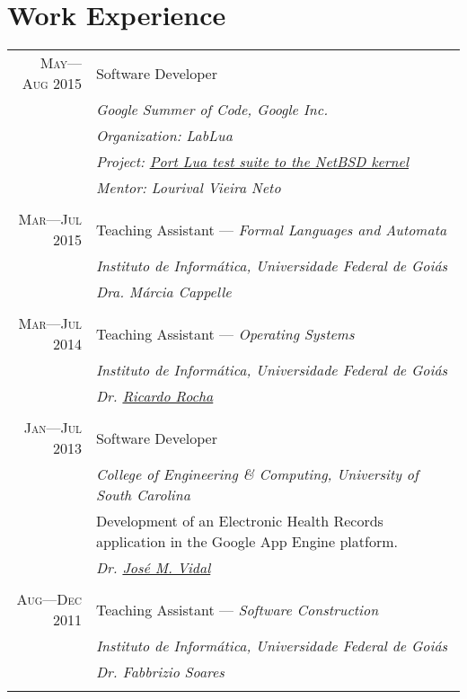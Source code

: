 \documentclass[a4paper,10pt]{article}
\begin{document}
\section{Work Experience}
\begin{tabular}{r|p{11cm}}

  \textsc{May---Aug 2015}
  & Software Developer\\
  &\emph{Google Summer of Code, Google Inc.}\\
  &\emph{Organization: LabLua}\\
  &\emph{Project: \footnotesize{\href{https://www.google-melange.com/gsoc/project/details/google/gsoc2015/gmesalazar/5741031244955648}{Port Lua test suite to the NetBSD kernel}}}\\
  &\emph{Mentor: Lourival Vieira Neto}
  \\\multicolumn{2}{c}{} \\

  \textsc{Mar---Jul 2015}
  & Teaching Assistant --- \emph{Formal Languages and Automata}\\
  &\emph{Instituto de Informática, Universidade Federal de Goiás}\\
  &\emph{Dra. {Márcia Cappelle}}
  \\\multicolumn{2}{c}{} \\

  \textsc{Mar---Jul 2014}
  & Teaching Assistant --- \emph{Operating Systems}\\
  &\emph{Instituto de Informática, Universidade Federal de Goiás}\\
  &\emph{Dr. \href{http://inf.ufg.br/~ricardo/}{Ricardo Rocha}}
  \\\multicolumn{2}{c}{} \\

  \textsc{Jan---Jul 2013}
  & Software Developer\\
  &\emph{College of Engineering \& Computing, University of South Carolina}\\
  &\footnotesize{Development of an Electronic Health Records application in the Google App Engine platform.}\\
  &\emph{Dr. \href{http://jmvidal.cse.sc.edu}{José M. Vidal}}
  \\\multicolumn{2}{c}{} \\

  \textsc{Aug---Dec 2011}
  & Teaching Assistant --- \emph{Software Construction}\\
  &\emph{Instituto de Informática, Universidade Federal de Goiás}\\
  &\emph{Dr. Fabbrizio Soares}
  \\\multicolumn{2}{c}{} \\

\end{tabular}
\end{document}
